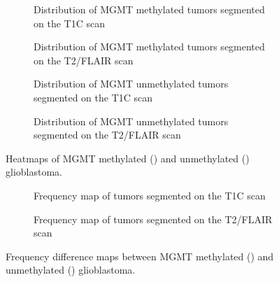 \begin{figure}
    \centering
    \begin{subfigure}[b]{\textwidth}
        \centering
        \caption{Distribution of \gls{MGMT} methylated \glspl{tumor} segmented on  the \gls{T1C} scan}\label{fig:HGG_location_heatmap_methylated_T1}
    \end{subfigure}
    \begin{subfigure}[b]{\textwidth}
        \centering
        \caption{Distribution of \gls{MGMT} methylated \glspl{tumor} segmented on  the \gls{T2}/\gls{FLAIR} scan}\label{fig:HGG_location_heatmap_methylated_T2}
    \end{subfigure}
    \begin{subfigure}[b]{\textwidth}
        \centering
        \caption{Distribution of \gls{MGMT} unmethylated \glspl{tumor} segmented on  the \gls{T1C} scan}\label{fig:HGG_location_heatmap_unmethylated_T1}
    \end{subfigure}
    \begin{subfigure}[b]{\textwidth}
        \centering
        \caption{Distribution of \gls{MGMT} unmethylated \glspl{tumor} segmented on  the \gls{T2}/\gls{FLAIR} scan}\label{fig:HGG_location_heatmap_unmethylated_T2}
    \end{subfigure}
    \caption{Heatmaps of \acrshort{MGMT} methylated () and unmethylated () glioblastoma.}\label{fig:HGG_location_heatmap_genetic}
\end{figure}


\begin{figure}
    \centering
    \begin{subfigure}[b]{\textwidth}
        \centering
        \caption{Frequency map of \glspl{tumor} segmented on  the \gls{T1C} scan}\label{fig:HGG_location_frequency_T1}
    \end{subfigure}
    \begin{subfigure}[b]{\textwidth}
        \centering
        \caption{Frequency map of \glspl{tumor} segmented on  the \gls{T2}/\gls{FLAIR} scan}\label{fig:HGG_location_frequency_T2}
    \end{subfigure}
    \caption{Frequency difference maps between \acrshort{MGMT} methylated () and unmethylated () glioblastoma.}\label{fig:HGG_location_frequency_map}
\end{figure}

